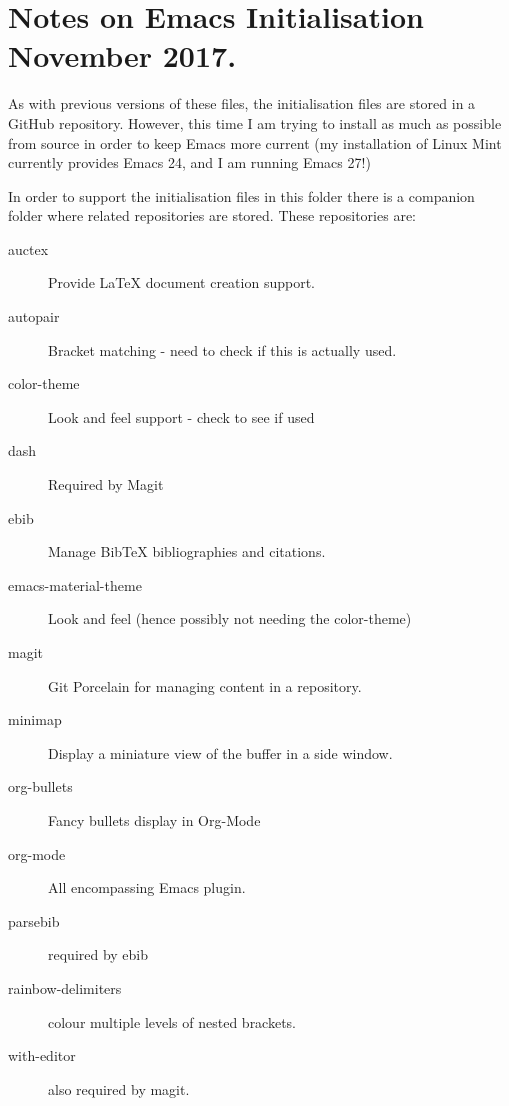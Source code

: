 \documentclass[a4paper]{article}
\begin{document}
\section{Notes on Emacs Initialisation November 2017.}
\label{sec:notes-emacs-init}

As with previous versions of these files, the initialisation files are
stored in a GitHub repository.  However, this time I am trying to
install as much as possible from source in order to keep Emacs more
current (my installation of Linux Mint currently provides Emacs 24,
and I am running Emacs 27!)

In order to support the initialisation files in this folder there is a
companion folder where related repositories are stored. These
repositories are:

\begin{description}
\item[auctex] Provide \LaTeX{} document creation support.
\item[autopair] Bracket matching - need to check if this is actually used.
\item[color-theme] Look and feel support - check to see if used
\item[dash] Required by Magit
\item[ebib] Manage BibTeX bibliographies and citations.
\item[emacs-material-theme] Look and feel (hence possibly not needing
  the color-theme)
\item[magit] Git Porcelain for managing content in a repository.
\item[minimap] Display a miniature view of the buffer in a side window.
\item[org-bullets] Fancy bullets display in Org-Mode
\item[org-mode] All encompassing Emacs plugin.
\item[parsebib] required by ebib
\item[rainbow-delimiters] colour multiple levels of nested brackets.
\item[with-editor] also required by magit.
\end{description}
\end{document}
